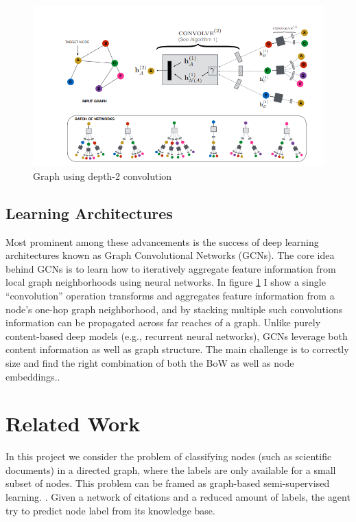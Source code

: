 \documentclass{report}
\begin{document}
\begin{figure}[htbp]
\centering
\includegraphics[scale=0.3]{gconv.png}
\caption{Graph using depth-2 convolution}
\label{fig:conv}
\end{figure}

\subsection{Learning Architectures}
Most prominent among these advancements is the success
of deep learning architectures known as Graph Convolutional
Networks (GCNs). The core idea behind GCNs is
to learn how to iteratively aggregate feature information from local
graph neighborhoods using neural networks. In figure \ref{fig:conv} I show a 
single “convolution” operation transforms and aggregates feature
information from a node’s one-hop graph neighborhood, and by
stacking multiple such convolutions information can be propagated
across far reaches of a graph. Unlike purely content-based deep
models (e.g., recurrent neural networks), GCNs leverage both
content information as well as graph structure. 
The main challenge is to correctly size and find the right combination of both the BoW as well as node embeddings.\cite{deep_GCN}.





\section{Related Work}
In this project we consider the problem of classifying nodes (such as scientific documents) in a directed graph,  where the labels are only available for a small subset of nodes. This problem can be framed as graph-based semi-supervised learning. \cite{Kipf_GCN}. Given a network of citations and a reduced amount of labels, the agent try to predict node label from its knowledge base.
\end{document}
